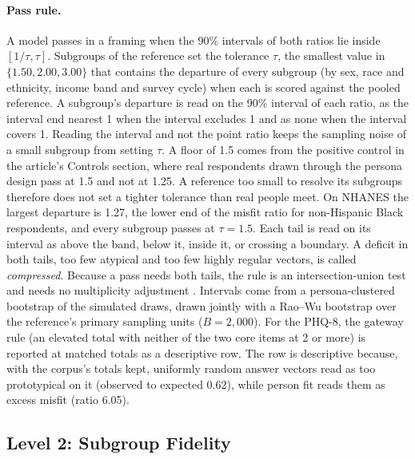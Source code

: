 \paragraph{Pass rule.}
A model passes in a framing when the 90\% intervals of both ratios lie inside $[1/\tau, \tau]$.
Subgroups of the reference set the tolerance $\tau$, the smallest value in $\{1.50, 2.00, 3.00\}$ that contains the departure of every subgroup (by sex, race and ethnicity, income band and survey cycle) when each is scored against the pooled reference.
A subgroup's departure is read on the 90\% interval of each ratio, as the interval end nearest 1 when the interval excludes 1 and as none when the interval covers 1.
Reading the interval and not the point ratio keeps the sampling noise of a small subgroup from setting $\tau$.
A floor of 1.5 comes from the positive control in the article's Controls section, where real respondents drawn through the persona design pass at 1.5 and not at 1.25.
A reference too small to resolve its subgroups therefore does not set a tighter tolerance than real people meet.
On NHANES the largest departure is 1.27, the lower end of the misfit ratio for non-Hispanic Black respondents, and every subgroup passes at $\tau = 1.5$. %
Each tail is read on its interval as above the band, below it, inside it, or crossing a boundary.
A deficit in both tails, too few atypical and too few highly regular vectors, is called \emph{compressed}.
Because a pass needs both tails, the rule is an intersection-union test and needs no multiplicity adjustment \citep{berger1982iut}.
Intervals come from a persona-clustered bootstrap of the simulated draws, drawn jointly with a Rao--Wu bootstrap over the reference's primary sampling units \citep{raowu1988resampling,raowuyue1992resampling} ($B = 2{,}000$).
For the PHQ-8, the gateway rule (an elevated total with neither of the two core items at 2 or more) is reported at matched totals as a descriptive row.
The row is descriptive because, with the corpus's totals kept, uniformly random answer vectors read as too prototypical on it (observed to expected 0.62), while person fit reads them as excess misfit (ratio 6.05). %


\subsection*{Level 2: Subgroup Fidelity}
\label{sec:s7-l2}

